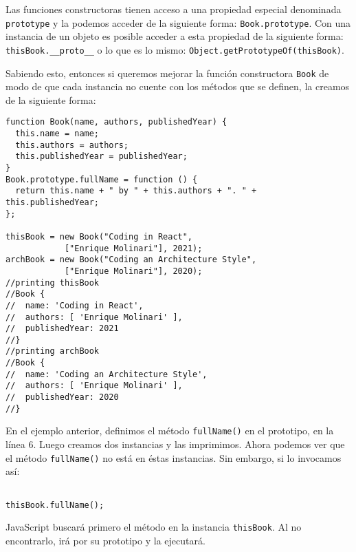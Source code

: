 \documentclass[a4paper, oneside, titlepage, 12pt]{paper}
\begin{document}
Las funciones constructoras tienen acceso a una propiedad especial denominada \texttt{prototype} y la podemos acceder de la siguiente forma: \texttt{Book.prototype}. Con una instancia de un objeto es posible acceder a esta propiedad de la siguiente forma: \texttt{thisBook.__proto__} o lo que es lo mismo: \texttt{Object.getPrototypeOf(thisBook)}. 
\newline

Sabiendo esto, entonces si queremos mejorar la función constructora \texttt{Book} de modo de que cada instancia no cuente con los métodos que se definen, la creamos de la siguiente forma:

\begin{verbatim}
function Book(name, authors, publishedYear) {
  this.name = name;
  this.authors = authors;
  this.publishedYear = publishedYear;
}
Book.prototype.fullName = function () {
  return this.name + " by " + this.authors + ". " + this.publishedYear;
};               
               
thisBook = new Book("Coding in React", 
			["Enrique Molinari"], 2021);
archBook = new Book("Coding an Architecture Style", 
			["Enrique Molinari"], 2020);
//printing thisBook
//Book {
//  name: 'Coding in React',
//  authors: [ 'Enrique Molinari' ],
//  publishedYear: 2021
//}
//printing archBook
//Book {
//  name: 'Coding an Architecture Style',
//  authors: [ 'Enrique Molinari' ],
//  publishedYear: 2020
//}
\end{verbatim}

En el ejemplo anterior, definimos el método \texttt{fullName()} en el prototipo, en la línea 6. Luego creamos dos instancias y las imprimimos. Ahora podemos ver que el método \texttt{fullName()} no está en éstas instancias. Sin embargo, si lo invocamos así:

\begin{verbatim}

thisBook.fullName();
\end{verbatim}

JavaScript buscará primero el método en la instancia \texttt{thisBook}. Al no encontrarlo, irá por su prototipo y la ejecutará.
\newline
\end{document}
